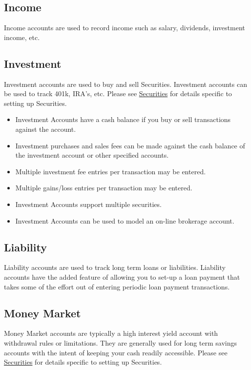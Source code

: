 \documentclass[letterpaper,12pt]{book}
\begin{document}
    \subsection{Income}
    Income accounts are used to record income such as salary, dividends, investment income, etc.

    \subsection{Investment}
    \label{sub:investaccount}
    Investment accounts are used to buy and sell Securities.
    Investment accounts can be used to track 401k, IRA's, etc.
    Please see \hyperref[ch:securities]{Securities} for details specific to setting up Securities.       

    \begin{itemize}
        \item Investment Accounts have a cash balance if you buy or sell transactions against the account.
        \item Investment purchases and sales fees can be made against the cash balance of the investment account or
        other specified accounts.
        \item Multiple investment fee entries per transaction may be entered.
        \item Multiple gains/loss entries per transaction may be entered.
        \item Investment Accounts support multiple securities.
        \item Investment Accounts can be used to model an on-line brokerage account.
    \end{itemize}

    \subsection{Liability}
    Liability accounts are used to track long term loans or liabilities.
    Liability accounts have the added feature of allowing you to set-up a loan payment that takes some of the
    effort out of entering periodic loan payment transactions.

    \subsection{Money Market}
    Money Market accounts are typically a high interest yield account with withdrawal rules or limitations.
    They are generally used for long term savings accounts with the intent of keeping your cash readily accessible.
    Please see \hyperref[ch:securities]{Securities} for details specific to setting up Securities.
\end{document}
